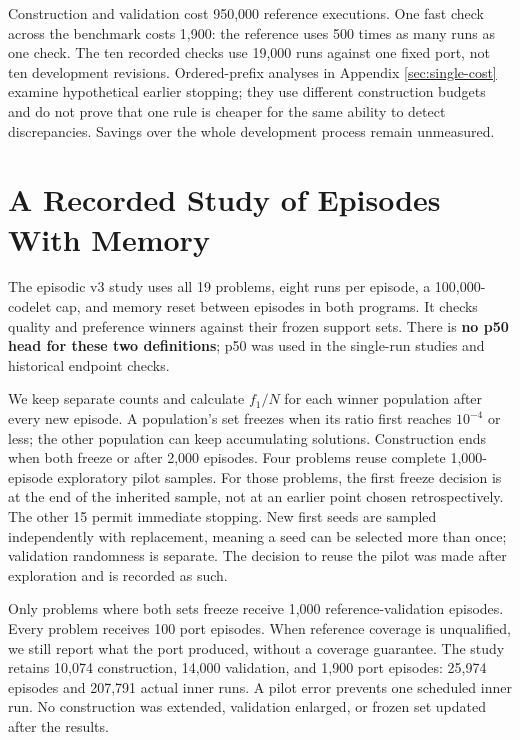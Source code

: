 \documentclass[10pt,letterpaper]{article}
\begin{document}
Construction and validation cost 950,000 reference executions. One fast check across the
benchmark costs 1,900: the reference uses 500 times as many runs as one check. The ten
recorded checks use 19,000 runs against one fixed port, not ten development revisions.
Ordered-prefix analyses in Appendix \ref{sec:single-cost} examine hypothetical earlier
stopping; they use different construction budgets and do not prove that one rule is
cheaper for the same ability to detect discrepancies. Savings over the whole development
process remain unmeasured.

\section{A Recorded Study of Episodes With Memory}\label{sec:episodic-coverage}

The episodic v3 study uses all 19 problems, eight runs per episode, a 100,000-codelet cap,
and memory reset between episodes in both programs. It checks quality and preference
winners against their frozen support sets. There is \textbf{no p50 head for these two
definitions}; p50 was used in the single-run studies and historical endpoint checks.

We keep separate counts and calculate \(f_1/N\) for each winner population after every new
episode. A population's set freezes when its ratio first reaches \(10^{-4}\) or less; the
other population can keep accumulating solutions. Construction ends when both freeze or
after 2,000 episodes. Four problems reuse complete 1,000-episode exploratory pilot
samples. For those problems, the first freeze decision is at the end of the inherited
sample, not at an earlier point chosen retrospectively. The other 15 permit immediate
stopping. New first seeds are sampled independently with replacement, meaning a seed can
be selected more than once; validation randomness is separate. The decision to reuse the
pilot was made after exploration and is recorded as such.

Only problems where both sets freeze receive 1,000 reference-validation episodes. Every
problem receives 100 port episodes. When reference coverage is unqualified, we still
report what the port produced, without a coverage guarantee. The study retains 10,074
construction, 14,000 validation, and 1,900 port episodes: 25,974 episodes and 207,791
actual inner runs. A pilot error prevents one scheduled inner run. No construction was
extended, validation enlarged, or frozen set updated after the results.
\end{document}
